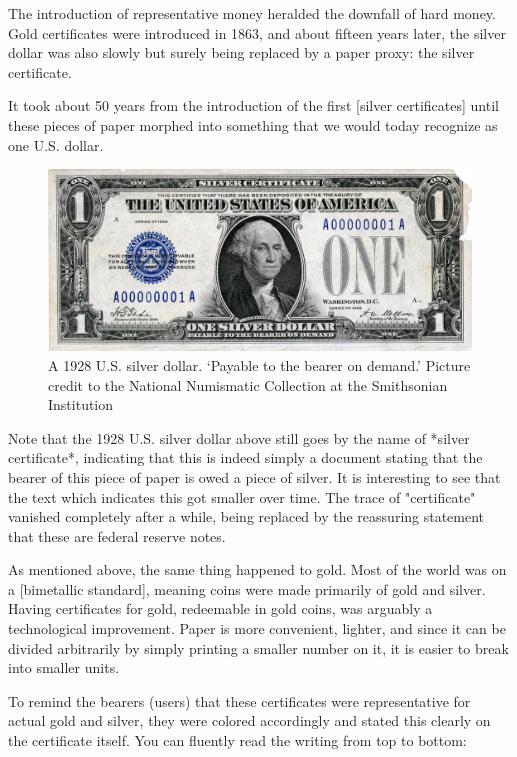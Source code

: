 The introduction of representative money heralded the downfall of hard
money. Gold certificates were introduced in 1863, and about fifteen
years later, the silver dollar was also slowly but surely being replaced
by a paper proxy: the silver certificate.

It took about 50 years from the introduction of the first [silver
certificates] until these pieces of paper morphed into something that we
would today recognize as one U.S. dollar.

\begin{figure}
  \centering
  \includegraphics{assets/images/us-silver-dollar-note-smaller.png}
  \caption{A 1928 U.S. silver dollar. `Payable to the bearer on demand.' Picture credit to the National Numismatic Collection at the Smithsonian Institution}
  \label{fig:us-silver-dollar-note-smaller}
\end{figure}

Note that the 1928 U.S. silver dollar above still goes by the name of
*silver certificate*, indicating that this is indeed simply a document
stating that the bearer of this piece of paper is owed a piece of
silver. It is interesting to see that the text which indicates this got
smaller over time. The trace of "certificate" vanished completely after
a while, being replaced by the reassuring statement that these are
federal reserve notes.

As mentioned above, the same thing happened to gold. Most of the world
was on a [bimetallic standard], meaning coins were made primarily of
gold and silver. Having certificates for gold, redeemable in gold coins,
was arguably a technological improvement. Paper is more convenient,
lighter, and since it can be divided arbitrarily by simply printing a
smaller number on it, it is easier to break into smaller units.

To remind the bearers (users) that these certificates were
representative for actual gold and silver, they were colored accordingly
and stated this clearly on the certificate itself. You can fluently read
the writing from top to bottom:

